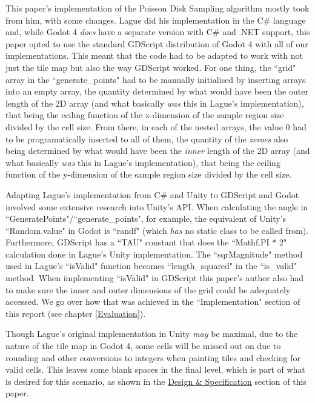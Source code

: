 This paper's implementation of the Poisson Disk Sampling algorithm mostly took from him, with some changes. Lague did his implementation in the C\# language and, while Godot 4 \textit{does} have a separate version with C\# and .NET support, this paper opted to use the standard GDScript distribution of Godot 4 with all of our implementations. This meant that the code had to be adapted to work with not just the tile map but also the way GDScript worked. For one thing, the ``grid" array in the ``generate\_points" had to be manually initialised by inserting arrays into an empty array, the quantity determined by what would have been the outer length of the 2D array (and what basically \textit{was} this in Lague's implementation), that being the ceiling function of the x-dimension of the sample region size divided by the cell size. From there, in each of the nested arrays, the value 0 had to be programatically inserted to all of them, the quantity of the \textit{zeroes} also being determined by what would have been the \textit{inner} length of the 2D array (and what basically \textit{was} this in Lague's implementation), that being the ceiling function of the y-dimension of the sample region size divided by the cell size.

Adapting Lague's implementation from C\# and Unity to GDScript and Godot involved some extensive research into Unity's API. When calculating the angle in ``GeneratePoints"/``generate\_points", for example, the equivalent of Unity's ``Random.value" in Godot is ``randf" (which \textit{has} no static class to be called from). Furthermore, GDScript has a ``TAU" constant that does the ``Mathf.PI * 2" calculation done in Lague's Unity implementation. The ``sqrMagnitude" method used in Lague's ``isValid" function becomes ``length\_squared" in the ``is\_valid" method. When implementing ``isValid" in GDScript this paper's author also had to make sure the inner and outer dimensions of the grid could be adequately accessed. We go over how that was achieved in the ``Implementation" section of this report (see chapter \ref{Evaluation}).

Though Lague's original implementation in Unity \textit{may} be maximal, due to the nature of the tile map in Godot 4, some cells will be missed out on due to rounding and other conversions to integers when painting tiles and checking for valid cells. This leaves some blank spaces in the final level, which is part of what is desired for this scenario, as shown in the \hyperref[Design]{Design \& Specification} section of this paper. 

